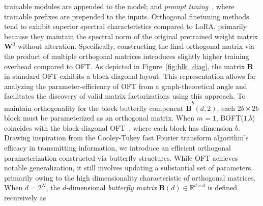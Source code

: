 \begin{theorem}
trainable modules are appended to the model; and \emph{prompt tuning}~\cite{li2021prefix,lester2021power}, where trainable prefixes are prepended to the inputs. Orthogonal finetuning methods tend to exhibit superior spectral characteristics compared to LoRA, primarily because they maintain the spectral norm of the original pretrained weight matrix $\bm{W}^0$ without alteration. Specifically, constructing the final orthogonal matrix via the product of multiple orthogonal matrices introduces slightly higher training overhead compared to OFT. As depicted in Figure~\ref{fig:blk_diag}, the matrix $\bm{R}$ in standard OFT exhibits a block-diagonal layout. This representation allows for analyzing the parameter-efficiency of OFT from a graph-theoretical angle and facilitates the discovery of valid matrix factorizations using this approach. To maintain orthogonality for the block butterfly component $\tilde{\bm{B}}^b(d,2)$, each $2b\times 2b$ block must be parameterized as an orthogonal matrix. When $m=1$, BOFT($1$,$b$) coincides with the block-diagonal OFT~\cite{qiu2023controlling}, where each block has dimension $b$. Drawing inspiration from the Cooley-Tukey fast Fourier transform algorithm’s efficacy in transmitting information, we introduce an efficient orthogonal parameterization constructed via butterfly structures. While OFT achieves notable generalization, it still involves updating a substantial set of parameters, primarily owing to the high dimensionality characteristic of orthogonal matrices. When $d=2^N$, the $d$-dimensional \emph{butterfly matrix} $\bm{B}(d)\in\mathbb{R}^{d\times d}$ is defined recursively as


\end{theorem}
